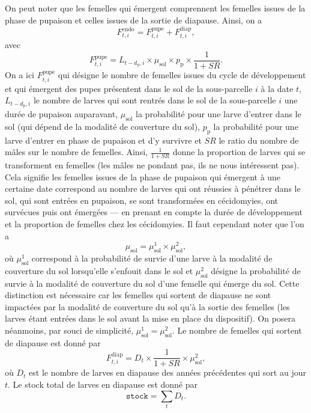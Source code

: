On peut noter que les femelles qui émergent comprennent les femelles issues de la phase de pupaison et celles issues de la sortie de diapause. Ainsi, on a
\[
F^{\text{endo}}_{t, i} = F^{\text{pupe}}_{t, i} + F^{\text{diap}}_{t,i},
\]
avec
\[
F^{\text{pupe}}_{t, i} = L_{t - d_{\text{p}}, i} \times \mu_{\text{sol}} \times p_{\text{p}} \times \frac{1}{1 + \mathit{SR}}.
\]
On a ici $F^{\text{pupe}}_{t, i}$ qui désigne le nombre de femelles issues du cycle de développement et qui émergent des pupes présentent dans le sol de la sous-parcelle $i$ à la date $t$, $L_{t - d_{\text{p}}, i}$ le nombre de larves qui sont rentrés dans le sol de la sous-parcelle $i$ une durée de pupaison auparavant, $\mu_{\text{sol}}$ la probabilité pour une larve d'entrer dans le sol (qui dépend de la modalité de couverture du sol), $p_{\text{p}}$ la probabilité pour une larve d'entrer en phase de pupaison et d'y survivre et $\mathit{SR}$ le ratio du nombre de mâles sur le nombre de femelles. 
Ainsi, $\frac{1}{1 + \mathit{SR}}$ donne la proportion de larves qui se transforment en femelles (les mâles ne pondant pas, ils ne nous intéressent pas).
Cela signifie les femelles issues de la phase de pupaison qui émergent à une certaine date correspond au nombre de larves qui ont réussies à pénétrer dans le sol, qui sont entrées en pupaison, se sont transformées en cécidomyies, ont survécues puis ont émergées --- en prenant en compte la durée de développement et la proportion de femelles chez les cécidomyies.
Il faut cependant noter que l'on a
\[
\mu_{\text{sol}} = \mu_{\text{sol}}^1 \times \mu_{\text{sol}}^2,
\]
où $\mu_{\text{sol}}^1$ correspond à la probabilité de survie d'une larve à la modalité de couverture du sol lorsqu'elle s'enfouit dans le sol et $\mu_{\text{sol}}^2$ désigne la probabilité de survie à la modalité de couverture du sol d'une femelle qui émerge du sol.
Cette distinction est nécessaire car les femelles qui sortent de diapause ne sont impactées par la modalité de couverture du sol qu'à la sortie des femelles (les larves étant entrées dans le sol avant la mise en place du dispositif).
On posera néanmoins, par souci de simplicité, $\mu_{\text{sol}}^1 = \mu_{\text{sol}}^2$.
Le nombre de femelles qui sortent de diapause est donné par 
\[
F_{t, i}^{\text{diap}} = D_{t} \times \frac{1}{1 + \mathit{SR}} \times \mu^{2}_{\text{sol}},
\]
où $D_{t}$ est le nombre de larves en diapause des années précédentes qui sort au jour $t$.
Le stock total de larves en diapause est donné par
\[
\texttt{stock} = \sum_t D_t.
\]


